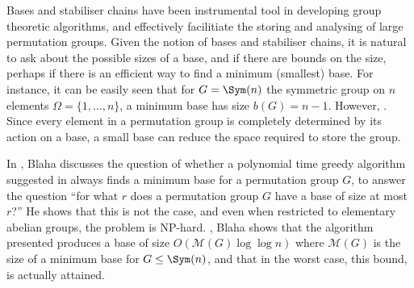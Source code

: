 Bases and stabiliser chains have been  instrumental tool in developing group theoretic algorithms, and effectively facilitiate the storing and analysing of large permutation groups. Given the notion of bases and stabiliser chains, it is natural to ask about the possible sizes of a base, and if there are bounds on the size, perhaps if there is an efficient way to find a minimum (smallest) base. For instance, it can be easily seen that for $G = \Sym(n)$ the symmetric group on $n$ elements $\Omega = \{1,\dotsc,n\}$, a minimum base has size $b(G) = n-1$. However, . Since every element in a permutation group is completely determined by its action on a base, a small base can reduce the space required to store the group.

In \cite{blaha1992}, Blaha discusses the question of whether a polynomial time greedy algorithm suggested in \cite{brown1989} always finds a minimum base for a permutation group $G$, to answer the question ``for what $r$ does a permutation group $G$ have a base of size at most $r$?'' He shows that this is not the case, and even when restricted to elementary abelian groups, the problem is NP-hard. , Blaha shows that the algorithm presented produces a base of size $O(\mathcal{M}(G)\log\log n)$ where $\mathcal{M}(G)$ is the size of a minimum base for $G \leq \Sym(n)$, and that in the worst case, this bound,  is actually attained. 

